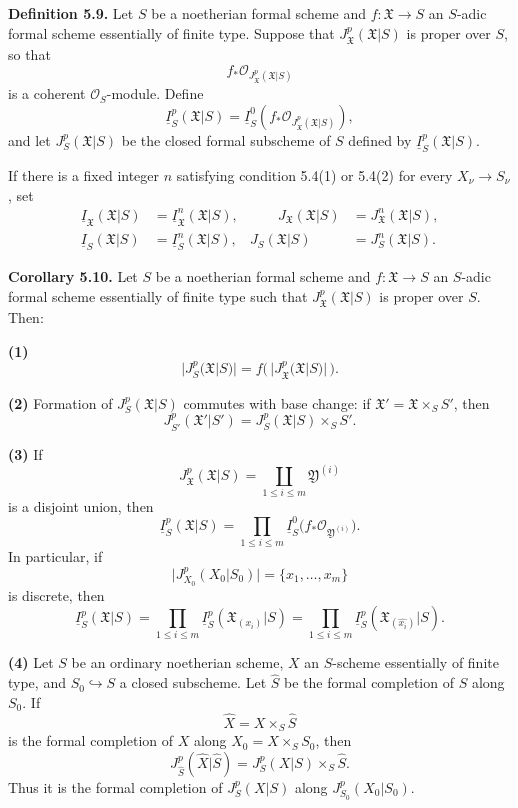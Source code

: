 \medskip
\noindent\textbf{Definition 5.9.}
Let $S$ be a noetherian formal scheme and
$f:\mathfrak X\longrightarrow S$ an $S$-adic formal scheme
essentially of finite type. Suppose that
$J_{\mathfrak X}^p(\mathfrak X|S)$ is proper over $S$, so that
\[
f_*\mathcal O_{J_{\mathfrak X}^p(\mathfrak X|S)}
\]
is a coherent $\mathcal O_S$-module. Define
\[
\underline I_S^p(\mathfrak X|S)
=\underline I_S^0\!\left(
 f_*\mathcal O_{J_{\mathfrak X}^p(\mathfrak X|S)}
\right),
\]
and let $J_S^p(\mathfrak X|S)$ be the closed formal subscheme of $S$
defined by $\underline I_S^p(\mathfrak X|S)$.

If there is a fixed integer $n$ satisfying condition 5.4(1) or
5.4(2) for every $X_\nu\longrightarrow S_\nu$, set
\[
\begin{aligned}
\underline I_{\mathfrak X}(\mathfrak X|S)
 &=\underline I_{\mathfrak X}^n(\mathfrak X|S),
&\qquad
J_{\mathfrak X}(\mathfrak X|S)
 &=J_{\mathfrak X}^n(\mathfrak X|S),\\
\underline I_S(\mathfrak X|S)
 &=\underline I_S^n(\mathfrak X|S),
&
J_S(\mathfrak X|S)
 &=J_S^n(\mathfrak X|S).
\end{aligned}
\]

\medskip
\noindent\textbf{Corollary 5.10.}
Let $S$ be a noetherian formal scheme and
$f:\mathfrak X\longrightarrow S$ an $S$-adic formal scheme
essentially of finite type such that
$J_{\mathfrak X}^p(\mathfrak X|S)$ is proper over $S$. Then:

\smallskip
\noindent\textbf{(1)}
\[
\bigl|J_S^p(\mathfrak X|S)\bigr|
=f\bigl(\,|J_{\mathfrak X}^p(\mathfrak X|S)|\,\bigr).
\]


\smallskip
\noindent\textbf{(2)} Formation of $J_S^p(\mathfrak X|S)$ commutes
with base change: if $\mathfrak X'=\mathfrak X\times_SS'$, then
\[
J_{S'}^p(\mathfrak X'|S')
=J_S^p(\mathfrak X|S)\times_SS'.
\]

\smallskip
\noindent\textbf{(3)} If
\[
J_{\mathfrak X}^p(\mathfrak X|S)
=\coprod_{1\leq i\leq m}\mathfrak Y^{(i)}
\]
is a disjoint union, then
\[
\underline I_S^p(\mathfrak X|S)
=\prod_{1\leq i\leq m}
 \underline I_S^0\bigl(f_*\mathcal O_{\mathfrak Y^{(i)}}\bigr).
\]
In particular, if
\[
\bigl|J_{X_0}^p(X_0|S_0)\bigr|=\{x_1,\ldots,x_m\}
\]
is discrete, then
\[
\underline I_S^p(\mathfrak X|S)
=\prod_{1\leq i\leq m}
 \underline I_S^p(\mathfrak X_{(x_i)}|S)
=\prod_{1\leq i\leq m}
 \underline I_S^p(\mathfrak X_{(\widehat{x_i})}|S).
\]

\smallskip
\noindent\textbf{(4)} Let $S$ be an ordinary noetherian scheme,
$X$ an $S$-scheme essentially of finite type, and
$S_0\hookrightarrow S$ a closed subscheme. Let $\widehat S$ be the
formal completion of $S$ along $S_0$. If
\[
\widehat X=X\times_S\widehat S
\]
is the formal completion of $X$ along
$X_0=X\times_SS_0$, then
\[
J_{\widehat S}^p(\widehat X|\widehat S)
=J_S^p(X|S)\times_S\widehat S.
\]
Thus it is the formal completion of $J_S^p(X|S)$ along
$J_{S_0}^p(X_0|S_0)$.

